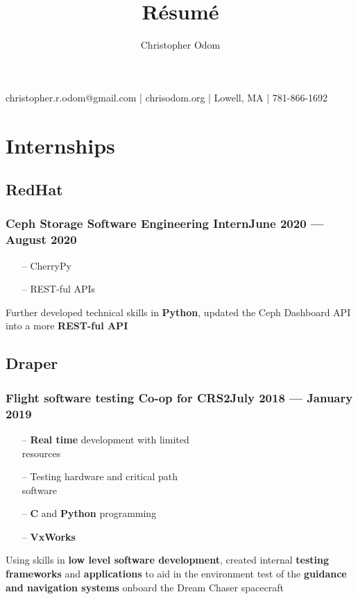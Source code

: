 \documentclass[11pt]{article}
\makeatletter
\renewcommand{\maketitle}
{
	\begin{center}\Huge \theauthor\end{center}
	{
		\begin{center}
			\large\noindent christopher.r.odom@gmail.com | chrisodom.org | Lowell, MA | 781-866-1692
		\end{center}
	}
}
\makeatother
\begin{document}
\setlength\multicolsep{0pt}



\title{R\'esum\'e}
\author{Christopher Odom}

\maketitle

\section{Internships}

\subsection{\bfseries RedHat}
\subsubsection{Ceph Storage Software Engineering Intern\dotfill June 2020 --- August 2020}
	\begin{multicols}{2}
		\begin{itemize}[noitemsep, topsep=0pt]
			\item[--] CherryPy
			\item[--] REST-ful APIs
		\end{itemize}
		\noindent
			Further developed technical skills in {\bf Python},
			updated the Ceph Dashboard
			API into a more {\bf REST-ful API}
	\end{multicols}

\subsection{\bfseries Draper}
\subsubsection{Flight software testing Co-op for CRS2\dotfill July 2018 --- January 2019}
	\begin{multicols}{2}
		\begin{itemize}[noitemsep, topsep=0pt]
			\item[--] {\bf Real time} development with limited\\resources
			\item[--] Testing hardware and critical path\\software
			\item[--] {\bf C} and {\bf Python} programming
			\item[--] {\bf VxWorks}
		\end{itemize}
		Using skills in {\bf low level software development},
		created internal {\bf testing frameworks} and 
		{\bf applications} to aid in the environment test of the
		{\bf guidance and navigation systems} onboard the Dream Chaser
		spacecraft
		\noindent
	\end{multicols}
\end{document}
